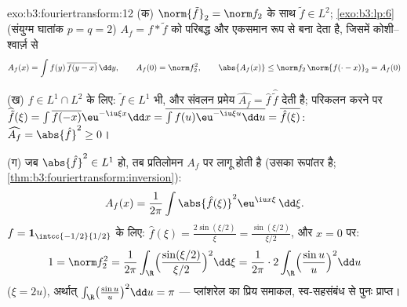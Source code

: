 \begin{solution}{exo:b3:fouriertransform:12}
(क) $\norm{\tilde f}_2 = \norm f_2$ के साथ $\tilde f \in L^2$; \cref{exo:b3:lp:6} (संयुग्म घातांक $p = q = 2$) $A_f = f * \tilde f$ को परिबद्ध
और एकसमान रूप से  बना देता है, जिसमें कोशी--श्वार्ज़ से
\[
A_f(x) = \int f(y)\,\overline{f(y - x)}\,\dd y,
\qquad A_f(0) = \norm f_2^2,
\qquad \abs{A_f(x)} \leq \norm f_2\,\norm{f(\cdot -
x)}_2 = A_f(0)
\]

(ख) $f \in L^1\cap L^2$ के लिए: $\tilde f \in L^1$ भी, और संवलन प्रमेय $\widehat{A_f} = \hat f\,
\widehat{\tilde f}$ देती है; परिकलन
करने पर $\widehat{\tilde f}(\xi) =
\int\overline{f(-x)}\eu^{-\iu\xi x}\dd x =
\overline{\int f(u)\eu^{-\iu\xi u}\dd u} =
\overline{\hat f(\xi)}$: $\widehat{A_f} = \abs{\hat f}^2
\geq 0$।

(ग) जब $\abs{\hat f}^2 \in L^1$ हो, तब प्रतिलोमन  $A_f$ पर लागू होती है (उसका
रूपांतर  है; \cref{thm:b3:fouriertransform:inversion}):
\[
A_f(x) = \frac1{2\pi}\int\abs{\hat f(\xi)}^2
\eu^{\iu x\xi}\,\dd\xi .
\]
$f = \mathbf 1_{\intcc{-1/2}{1/2}}$ के लिए: $\hat f(\xi) =
\frac{2\sin(\xi/2)}\xi = \frac{\sin(\xi/2)}{\xi/2}$, और $x = 0$ पर:
\[
1 = \norm f_2^2 = \frac1{2\pi}\int_\R
\Bigl(\frac{\sin(\xi/2)}{\xi/2}\Bigr)^2\dd\xi
= \frac1{2\pi}\cdot2\int_\R\Bigl(\frac{\sin u}u\Bigr)^2\dd u
\]
($\xi = 2u$), अर्थात् $\int_\R\bigl(\frac{\sin u}u\bigr)^2\dd
u = \pi$ --- प्लांशरेल का प्रिय समाकल, स्व-सहसंबंध से
पुनः प्राप्त।
\end{solution}

